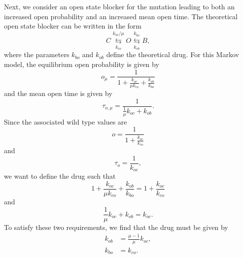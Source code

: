 Next, we consider an open state blocker for the mutation leading to both an
increased open probability and an increased mean open time. The theoretical open 
state blocker can be written in the form%
\begin{equation}
C\underset{k_{co}}{\overset{k_{oc}/\mu}{\leftrightarrows}}O\underset{k_{ob}%
}{\overset{k_{bo}}{\leftrightarrows}}B, \label{mmob1}%
\end{equation}
where the parameters $k_{bo}$ and $k_{ob}$ define the theoretical drug. For this
Markov model, the equilibrium open probability is given by%
\[
o_{\mu}=\frac{1}{1+\frac{k_{oc}}{\mu k_{co}}+\frac{k_{ob}}{k_{bo}}}%
\]
and the mean open time is given by%
\[
\tau_{o,\mu}=\frac{1}{\frac{1}{\mu}k_{oc}+k_{ob}}.
\]
Since the associated wild type values are%
\[
o=\frac{1}{1+\frac{k_{oc}}{k_{co}}}%
\]
and
\[
\tau_{o}=\frac{1}{k_{oc}},
\]
we want to define the drug such that%
\[
1+\frac{k_{oc}}{\mu k_{co}}+\frac{k_{ob}}{k_{bo}}=1+\frac{k_{oc}}{k_{co}}%
\]
and%
\[
\frac{1}{\mu}k_{oc}+k_{ob}=k_{oc}.
\]
To satisfy these two requirements, we find that the drug must be given by
\begin{equation} \label{mot_o_drg}
\begin{aligned}
k_{ob}  &  =\frac{\mu-1}{\mu}k_{oc},\\
k_{bo}  &  =k_{co}.
\end{aligned}
\end{equation}

